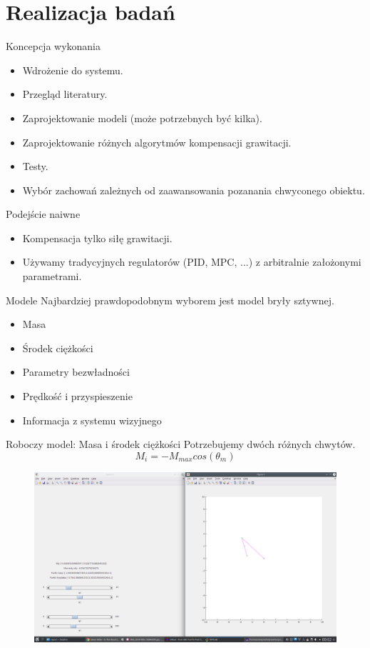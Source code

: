 \documentclass{beamer}
\begin{document}
\section{Realizacja badań}
\begin{frame}{Koncepcja wykonania}
	\begin{itemize}
		\item Wdrożenie do systemu.
		\item Przegląd literatury.
		\item Zaprojektowanie modeli (może potrzebnych być kilka).
		\item Zaprojektowanie różnych algorytmów kompensacji grawitacji.
		\item Testy.
		\item Wybór zachowań zależnych od zaawansowania pozanania chwyconego obiektu.
	\end{itemize}
\end{frame}

\begin{frame}{Podejście naiwne}
\begin{itemize}
	\item Kompensacja tylko siłę grawitacji. 
	\item Używamy tradycyjnych regulatorów (PID, MPC, ...) z arbitralnie założonymi parametrami.
\end{itemize}
	
\end{frame}

\begin{frame}{Modele}
Najbardziej prawdopodobnym wyborem jest model bryły sztywnej.
\begin{itemize}
	\item Masa
	\item Środek ciężkości
	\item Parametry bezwładności
	\item Prędkość i przyspieszenie
	\item Informacja z systemu wizyjnego
\end{itemize}
\end{frame}

\begin{frame}{Roboczy model: Masa i środek ciężkości}
	Potrzebujemy dwóch różnych chwytów.
	\[ M_i = -M_{max}cos(\theta_m)\]
	\begin{figure}
		\centering
		\includegraphics[scale=0.18]{matlab}
	\end{figure}
\end{frame}
\end{document}
